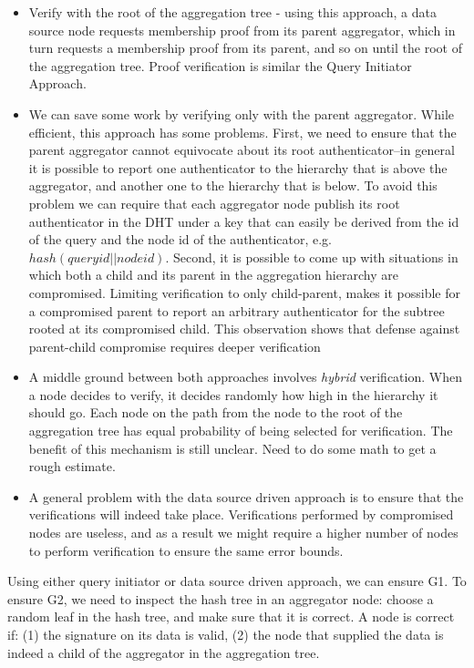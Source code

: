 \documentclass{article}
\begin{document}
\begin{itemize}
\item Verify with the root of the aggregation tree - using this
  approach, a data source node requests membership proof from its
  parent aggregator, which in turn requests a membership proof from
  its parent, and so on until the root of the aggregation tree. Proof
  verification is similar the Query Initiator Approach.
\item We can save some work by verifying only with the parent
  aggregator. While efficient, this approach has some problems. First,
  we need to ensure that the parent aggregator cannot equivocate about
  its root authenticator--in general it is possible to report one
  authenticator to the hierarchy that is above the aggregator, and
  another one to the hierarchy that is below. To avoid this problem we
  can require that each aggregator node publish its root authenticator
  in the DHT under a key that can easily be derived from the id of the
  query and the node id of the authenticator, e.g. $hash(query
  id||node id)$. Second, it is possible to come up with situations in
  which both a child and its parent in the aggregation hierarchy are
  compromised. Limiting verification to only child-parent, makes it
  possible for a compromised parent to report an arbitrary authenticator for the
  subtree rooted at its compromised child. This observation shows that
  defense against parent-child compromise requires deeper verification

\item A middle ground between both approaches involves \emph{hybrid}
  verification. When a node decides to verify, it decides randomly how
  high in the hierarchy it should go. Each node on the path from the
  node to the root of the aggregation tree has equal probability of
  being selected for verification. The benefit of this mechanism is
  still unclear. Need to do some math to get a rough estimate.

\item A general problem with the data source driven approach is to
  ensure that the verifications will indeed take place. Verifications
  performed by compromised nodes are useless, and as a result we might
  require a higher number of nodes to perform verification to ensure
  the same error bounds.
\end{itemize}


Using either query initiator or data source driven approach, we can
ensure G1. To ensure G2, we need to inspect the hash tree in an
aggregator node: choose a random leaf in the hash tree, and make sure
that it is correct. A node is correct if: (1) the signature on its
data is valid, (2) the node that supplied the data is indeed a child
of the aggregator in the aggregation tree. 
\end{document}
